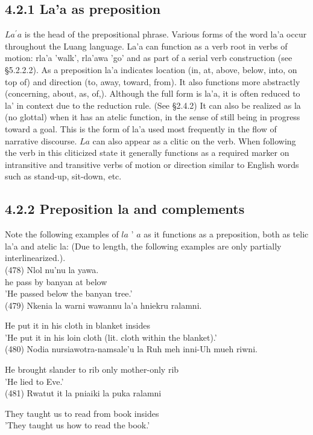 \documentclass[10pt]{article}
\begin{document}
\subsection*{4.2.1 La'a as preposition}
\(L a^{\prime} a\) is the head of the prepositional phrase. Various forms of the word la'a occur throughout the Luang language. La'a can function as a verb root in verbs of motion: rla'a 'walk', rla'awa 'go' and as part of a serial verb construction (see §5.2.2.2). As a preposition la'a indicates location (in, at, above, below, into, on top of) and direction (to, away, toward, from). It also functions more abstractly (concerning, about, as, of,). Although the full form is la'a, it is often reduced to la' in context due to the reduction rule. (See §2.4.2) It can also be realized as la (no glottal) when it has an atelic function, in the sense of still being in progress toward a goal. This is the form of la'a used most frequently in the flow of narrative discourse. \(L a\) can also appear as a clitic on the verb. When following the verb in this cliticized state it generally functions as a required marker on intransitive and transitive verbs of motion or direction similar to English words such as stand-up, sit-down, etc.

\subsection*{4.2.2 Preposition la and complements}
Note the following examples of \(l a\) ' \(a\) as it functions as a preposition, both as telic la'a and atelic la: (Due to length, the following examples are only partially interlinearized.).\\
(478) Nlol nu'nu la yawa.\\
he pass by banyan at below\\
'He passed below the banyan tree.'\\
(479) Nkenia la warni wawannu la'a hniekru ralamni.

He put it in his cloth in blanket insides\\
'He put it in his loin cloth (lit. cloth within the blanket).'\\
(480) Nodia nursiawotra-namsale'u la Ruh meh inni-Uh mueh riwni.

He brought slander to rib only mother-only rib\\
'He lied to Eve.'\\
(481) Rwatut it la pniaiki la puka ralamni

They taught us to read from book insides\\
'They taught us how to read the book.'
\end{document}
